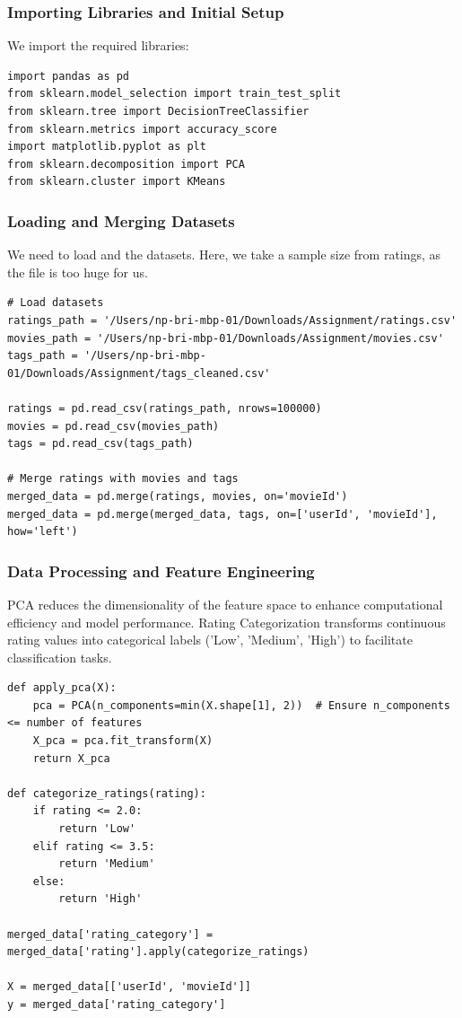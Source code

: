 \documentclass[conference]{IEEEtran}
\begin{document}
\subsubsection{Importing Libraries and Initial Setup}

We import the required libraries:

\begin{lstlisting}
import pandas as pd
from sklearn.model_selection import train_test_split
from sklearn.tree import DecisionTreeClassifier
from sklearn.metrics import accuracy_score
import matplotlib.pyplot as plt
from sklearn.decomposition import PCA
from sklearn.cluster import KMeans
\end{lstlisting}

\subsubsection{Loading and Merging Datasets}
We need to load and the datasets. Here, we take a sample size from ratings, as the file is too huge for us.
\begin{lstlisting}
# Load datasets
ratings_path = '/Users/np-bri-mbp-01/Downloads/Assignment/ratings.csv'
movies_path = '/Users/np-bri-mbp-01/Downloads/Assignment/movies.csv'
tags_path = '/Users/np-bri-mbp-01/Downloads/Assignment/tags_cleaned.csv'

ratings = pd.read_csv(ratings_path, nrows=100000)
movies = pd.read_csv(movies_path)
tags = pd.read_csv(tags_path)

# Merge ratings with movies and tags
merged_data = pd.merge(ratings, movies, on='movieId')
merged_data = pd.merge(merged_data, tags, on=['userId', 'movieId'], how='left')
\end{lstlisting}

\subsubsection{Data Processing and Feature Engineering}
PCA reduces the dimensionality of the feature space to enhance computational efficiency and model performance.
Rating Categorization transforms continuous rating values into categorical labels ('Low', 'Medium', 'High') to facilitate classification tasks.
\begin{lstlisting}
def apply_pca(X):
    pca = PCA(n_components=min(X.shape[1], 2))  # Ensure n_components <= number of features
    X_pca = pca.fit_transform(X)
    return X_pca

def categorize_ratings(rating):
    if rating <= 2.0:
        return 'Low'
    elif rating <= 3.5:
        return 'Medium'
    else:
        return 'High'

merged_data['rating_category'] = merged_data['rating'].apply(categorize_ratings)

X = merged_data[['userId', 'movieId']]
y = merged_data['rating_category']
\end{lstlisting}
\end{document}
